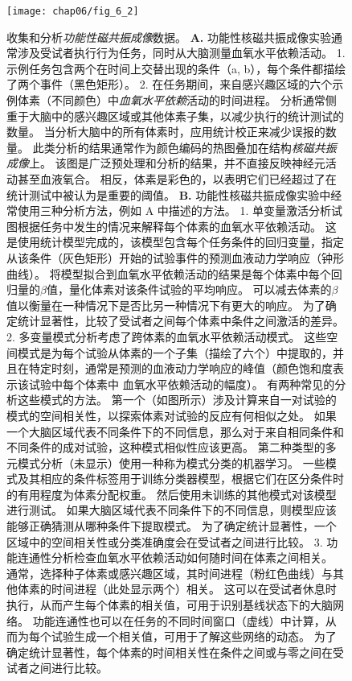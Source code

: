 \begin{figure}[htbp]
	\centering
	\texttt{[image: chap06/fig\_6\_2]}
	\caption{收集和分析\textit{功能性磁共振成像}数据。 
		\textbf{A.} 功能性核磁共振成像实验通常涉及受试者执行行为任务，同时从大脑测量血氧水平依赖活动。
		1. 示例任务包含两个在时间上交替出现的条件（a, b），每个条件都描绘了两个事件（黑色矩形）。
		2. 在任务期间，来自感兴趣区域的六个示例体素（不同颜色）中\textit{血氧水平依赖}活动的时间进程。 
		分析通常侧重于大脑中的感兴趣区域或其他体素子集，以减少执行的统计测试的数量。
		当分析大脑中的所有体素时，应用统计校正来减少误报的数量。
		此类分析的结果通常作为颜色编码的热图叠加在结构\textit{核磁共振成像}上。
		该图是广泛预处理和分析的结果，并不直接反映神经元活动甚至血液氧合。
		相反，体素是彩色的，以表明它们已经超过了在统计测试中被认为是重要的阈值。
		\textbf{B.} 功能性核磁共振成像实验中经常使用三种分析方法，例如 A 中描述的方法。
		1. 单变量激活分析试图根据任务中发生的情况来解释每个体素的血氧水平依赖活动。 
		这是使用统计模型完成的，该模型包含每个任务条件的回归变量，指定从该条件（灰色矩形）开始的试验事件的预测血液动力学响应（钟形曲线）。 
		将模型拟合到血氧水平依赖活动的结果是每个体素中每个回归量的$\beta$值，量化体素对该条件试验的平均响应。 
		可以减去体素的$\beta$值以衡量在一种情况下是否比另一种情况下有更大的响应。
		为了确定统计显著性，比较了受试者之间每个体素中条件之间激活的差异。
		2. 多变量模式分析考虑了跨体素的血氧水平依赖活动模式。
		这些空间模式是为每个试验从体素的一个子集（描绘了六个）中提取的，并且在特定时刻，通常是预测的血液动力学响应的峰值（颜色饱和度表示该试验中每个体素中 血氧水平依赖活动的幅度）。
		有两种常见的分析这些模式的方法。
		第一个（如图所示）涉及计算来自一对试验的模式的空间相关性，以探索体素对试验的反应有何相似之处。
		如果一个大脑区域代表不同条件下的不同信息，那么对于来自相同条件和不同条件的成对试验，这种模式相似性应该更高。
		第二种类型的多元模式分析（未显示）使用一种称为模式分类的机器学习。
		一些模式及其相应的条件标签用于训练分类器模型，根据它们在区分条件时的有用程度为体素分配权重。
		然后使用未训练的其他模式对该模型进行测试。
		如果大脑区域代表不同条件下的不同信息，则模型应该能够正确猜测从哪种条件下提取模式。
		为了确定统计显著性，一个区域中的空间相关性或分类准确度会在受试者之间进行比较。
		3. 功能连通性分析检查血氧水平依赖活动如何随时间在体素之间相关。
		通常，选择种子体素或感兴趣区域，其时间进程（粉红色曲线）与其他体素的时间进程（此处显示两个）相关。
		这可以在受试者休息时执行，从而产生每个体素的相关值，可用于识别基线状态下的大脑网络。
		功能连通性也可以在任务的不同时间窗口（虚线）中计算，从而为每个试验生成一个相关值，可用于了解这些网络的动态。
		为了确定统计显著性，每个体素的时间相关性在条件之间或与零之间在受试者之间进行比较。}
	\label{fig:6_2}
\end{figure}

